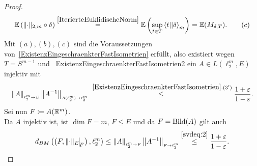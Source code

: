 \begin{proof}
\begin{align*}
\mathbb{E}\left(\lVert\cdot\rVert_{2, m} \circ \delta \right)
\overset{\ref{IterierteEuklidischeNorm}}=
\mathbb{E}\left(\sup_{t \in T}\left\langle t ||\delta\right\rangle_m \right) = \mathbb{E}(M_{\delta, T})\text.
\tag{$c$}
\end{align*}
Mit $(a),(b),(c)$ sind die Voraussetzungen von~\ref{ExistenzEingeschraenkterFastIsometrien} erfüllt, also existiert wegen
$T=S^{m-1}$ und~
{ExistenzEingeschraenkterFastIsometrien2} ein $A\in L(\ell_2^m,E)$ injektiv mit
\begin{align}\left\|A\right\|_{\scriptscriptstyle{\ell_2^m \rightarrow E}}\left\|A^{-1}\right\|_{\scriptscriptstyle{A(\ell_2^m) \rightarrow \ell_2^m}} \overset{~\ref{ExistenzEingeschraenkterFastIsometrien}.(3')} \le
\frac {1+\varepsilon}{1-\varepsilon}\text. \label{svdeq:2}
\end{align}
Sei nun $F \coloneqq  A(\mathbb{R}^m)$.\\
Da $A$ injektiv ist, ist $\dim F = m$, $F \le E$ und
da $F = \mathop{\textrm{Bild}}\nolimits(A)$ gilt auch
\[d_{BM}\left(\left(F, \restrict{\norm\cdot_E}F\right), \ell_2^m \right)
\le\opnorm A {\ell_2^m}F\opnorm{A\inv}{F}{\ell_2^m} \overset{\eqref{svdeq:2}}\le
\frac {1+\eps}{1-\eps}\text.\qedhere\]
\end{proof}